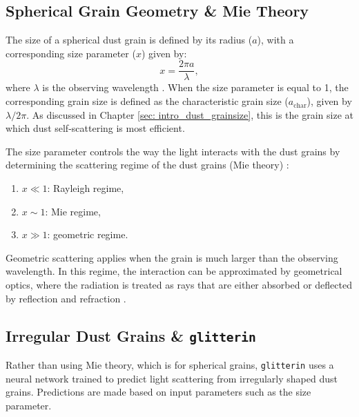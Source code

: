 \subsection{Spherical Grain Geometry \& Mie Theory}


 
The size of a spherical dust grain is defined by its radius ($a$), with a corresponding size parameter ($x$) given by:
\begin{equation}
 x = \frac{2\pi a}{\lambda},
 \label{eq: size_parameter}
\end{equation}
\noindent where $\lambda$ is the observing wavelength \citep{Zhang2023}. When the size parameter is equal to 1, the corresponding grain size is defined as the characteristic grain size ($a_{\text{char}}$), given by $\lambda/2\pi$. As discussed in Chapter \ref{sec: intro_dust_grainsize}, this is the grain size at which dust self-scattering is most efficient. 


The size parameter controls the way the light interacts with the dust grains by determining the scattering regime of the dust grains (Mie theory) \citep{Zhang2023}:
\begin{enumerate}
    \item $x \ll 1$: Rayleigh regime,
    \item $x \sim 1$: Mie regime,
    \item $x \gg 1$: geometric regime.
\end{enumerate}
\noindent Geometric scattering applies when the grain is much larger than the observing wavelength. In this regime, the interaction can be approximated by geometrical optics, where the radiation is treated as rays that are either absorbed or deflected by reflection and refraction \citep{Bohren1983}.



\subsection{Irregular Dust Grains \& \texttt{glitterin}}
\label{sec: ch5_glitterin}
Rather than using Mie theory, which is for spherical grains, \texttt{glitterin} uses a neural network trained to predict light scattering from irregularly shaped dust grains. Predictions are made based on input parameters such as the size parameter. 



